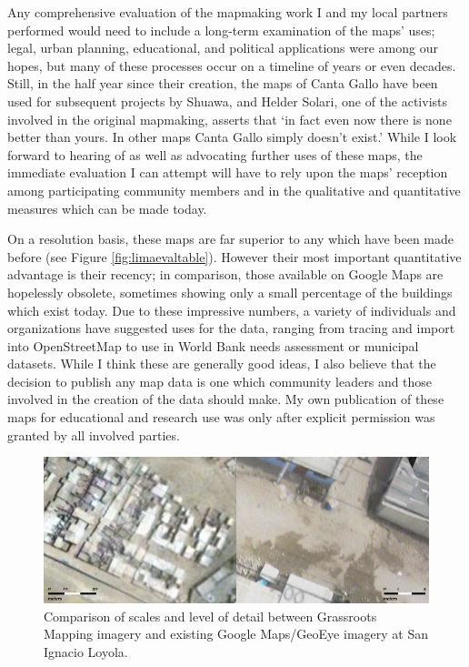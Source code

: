 \documentclass[11pt,oneside,notitlepage]{report}
\begin{document}
{{Any comprehensive evaluation of the mapmaking work I and my local partners performed would need to include a long-term examination of the maps' uses; legal, urban planning, educational, and political applications were among our hopes, but many of these processes occur on a timeline of years or even decades. Still, in the half year since their creation, the maps of Canta Gallo have been used for subsequent projects by Shuawa, and Helder Solari, one of the activists involved in the original mapmaking, asserts that `in fact even now there is none better than yours. In other maps Canta Gallo simply doesn't exist.' While I look forward to hearing of as well as advocating further uses of these maps, the immediate evaluation I can attempt will have to rely upon the maps' reception among participating community members and in the qualitative and quantitative measures which can be made today.

On a resolution basis, these maps are far superior to any which have been made before (see Figure \ref{fig:limaevaltable}). However their most important quantitative advantage is their recency; in comparison, those available on Google Maps are hopelessly obsolete, sometimes showing only a small percentage of the buildings which exist today. Due to these impressive numbers, a variety of individuals and organizations have suggested uses for the data, ranging from tracing and import into OpenStreetMap to use in World Bank needs assessment or municipal datasets. While I think these are generally good ideas, I also believe that the decision to publish any map data is one which community leaders and those involved in the creation of the data should make. My own publication of these maps for educational and research use was only after explicit permission was granted by all involved parties. 

\begin{figure}[h]
  \begin{center}
	\includegraphics[width=1\textwidth]{diagrams/san-ignacio-scale.jpg}
	\caption{Comparison of scales and level of detail between Grassroots Mapping imagery and existing Google Maps/GeoEye imagery at San Ignacio Loyola.}
  \end{center}
\end{figure}

}}
\end{document}

